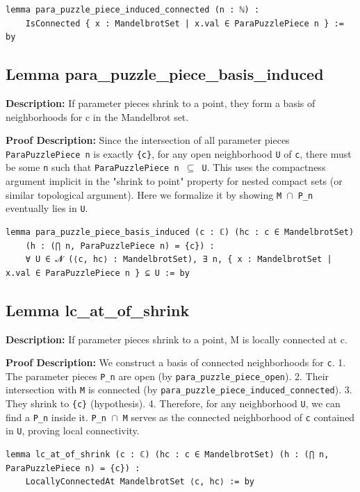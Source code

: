 \begin{lstlisting}[language=Lean]
lemma para_puzzle_piece_induced_connected (n : ℕ) :
    IsConnected { x : MandelbrotSet | x.val ∈ ParaPuzzlePiece n } := by
\end{lstlisting}

\subsection*{Lemma para\_puzzle\_piece\_basis\_induced}
\textbf{Description:} If parameter pieces shrink to a point, they form a basis of neighborhoods for c in the Mandelbrot set.

\textbf{Proof Description:} Since the intersection of all parameter pieces \texttt{ParaPuzzlePiece n} is exactly \texttt{\{c\}},
    for any open neighborhood \texttt{U} of \texttt{c}, there must be some \texttt{n} such that \texttt{ParaPuzzlePiece n $\subseteq$ U}.
    This uses the compactness argument implicit in the "shrink to point" property for nested compact sets
    (or similar topological argument). Here we formalize it by showing \texttt{M $\cap$ P\_n} eventually lies in \texttt{U}.

\begin{lstlisting}[language=Lean]
lemma para_puzzle_piece_basis_induced (c : ℂ) (hc : c ∈ MandelbrotSet)
    (h : (⋂ n, ParaPuzzlePiece n) = {c}) :
    ∀ U ∈ 𝓝 (⟨c, hc⟩ : MandelbrotSet), ∃ n, { x : MandelbrotSet | x.val ∈ ParaPuzzlePiece n } ⊆ U := by
\end{lstlisting}

\subsection*{Lemma lc\_at\_of\_shrink}
\textbf{Description:} If parameter pieces shrink to a point, M is locally connected at c.

\textbf{Proof Description:} We construct a basis of connected neighborhoods for \texttt{c}.
    1.  The parameter pieces \texttt{P\_n} are open (by \texttt{para\_puzzle\_piece\_open}).
    2.  Their intersection with \texttt{M} is connected (by \texttt{para\_puzzle\_piece\_induced\_connected}).
    3.  They shrink to \texttt{\{c\}} (hypothesis).
    4.  Therefore, for any neighborhood \texttt{U}, we can find a \texttt{P\_n} inside it. \texttt{P\_n $\cap$ M} serves
        as the connected neighborhood of \texttt{c} contained in \texttt{U}, proving local connectivity.

\begin{lstlisting}[language=Lean]
lemma lc_at_of_shrink (c : ℂ) (hc : c ∈ MandelbrotSet) (h : (⋂ n, ParaPuzzlePiece n) = {c}) :
    LocallyConnectedAt MandelbrotSet ⟨c, hc⟩ := by
\end{lstlisting}

